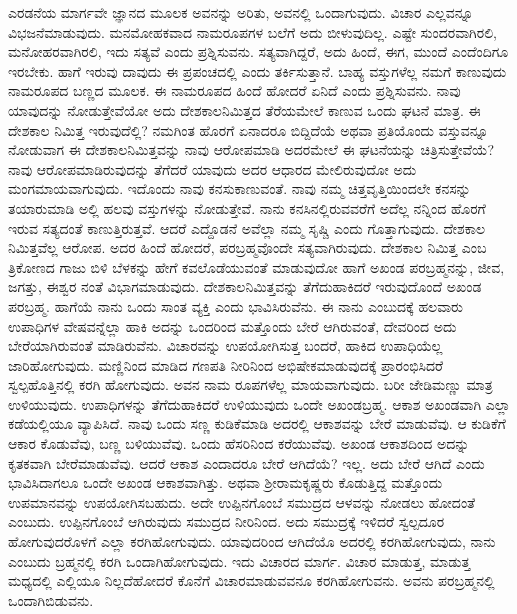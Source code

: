 ಎರಡನೆಯ ಮಾರ್ಗವೇ ಜ್ಞಾನದ ಮೂಲಕ ಅವನನ್ನು ಅರಿತು, ಅವನಲ್ಲಿ ಒಂದಾಗುವುದು. ವಿಚಾರ ಎಲ್ಲವನ್ನೂ ವಿಭಜನೆಮಾಡುವುದು. ಮನಮೋಹಕವಾದ ನಾಮರೂಪಗಳ ಬಲೆಗೆ ಅದು ಬೀಳುವುದಿಲ್ಲ. ಎಷ್ಟೇ ಸುಂದರವಾಗಿರಲಿ, ಮನೋಹರವಾಗಿರಲಿ, ಇದು ಸತ್ಯವೆ ಎಂದು ಪ್ರಶ್ನಿಸುವನು. ಸತ್ಯವಾಗಿದ್ದರೆ, ಅದು ಹಿಂದೆ, ಈಗ, ಮುಂದೆ ಎಂದೆಂದಿಗೂ ಇರಬೇಕು. ಹಾಗೆ ಇರುವು ದಾವುದು ಈ ಪ್ರಪಂಚದಲ್ಲಿ ಎಂದು ತರ್ಕಿಸುತ್ತಾನೆ. ಬಾಹ್ಯ ವಸ್ತುಗಳೆಲ್ಲ ನಮಗೆ ಕಾಣುವುದು ನಾಮರೂಪದ ಬಣ್ಣದ ಮೂಲಕ. ಈ ನಾಮರೂಪದ ಹಿಂದೆ ಹೋದರೆ ಏನಿದೆ ಎಂದು ಪ್ರಶ್ನಿಸುವನು. ನಾವು ಯಾವುದನ್ನು ನೋಡುತ್ತೇವೆಯೋ ಅದು ದೇಶಕಾಲನಿಮಿತ್ತದ ತೆರೆಯಮೇಲೆ ಕಾಣುವ ಒಂದು ಘಟನೆ ಮಾತ್ರ. ಈ ದೇಶಕಾಲ ನಿಮಿತ್ತ ಇರುವುದೆಲ್ಲಿ? ನಮಗಿಂತ ಹೊರಗೆ ಏನಾದರೂ ಬಿದ್ದಿದೆಯೆ ಅಥವಾ ಪ್ರತಿಯೊಂದು ವಸ್ತುವನ್ನೂ ನೋಡುವಾಗ ಈ ದೇಶಕಾಲನಿಮಿತ್ತವನ್ನು ನಾವು ಆರೋಪಮಾಡಿ ಅದರಮೇಲೆ ಈ ಘಟನೆಯನ್ನು ಚಿತ್ರಿಸುತ್ತೇವೆಯೆ? ನಾವು ಆರೋಪಮಾಡಿರುವುದನ್ನು ತೆಗೆದರೆ ಯಾವುದು ಅದರ ಆಧಾರದ ಮೇಲಿರುವುದೋ ಅದು ಮಂಗಮಾಯವಾಗುವುದು. ಇದೊಂದು ನಾವು ಕನಸುಕಾಣುವಂತೆ. ನಾವು ನಮ್ಮ ಚಿತ್ತವೃತ್ತಿಯಿಂದಲೇ ಕನಸನ್ನು ತಯಾರುಮಾಡಿ ಅಲ್ಲಿ ಹಲವು ವಸ್ತುಗಳನ್ನು ನೋಡುತ್ತೇವೆ. ನಾನು ಕನಸಿನಲ್ಲಿರುವವರೆಗೆ ಅದೆಲ್ಲ ನನ್ನಿಂದ ಹೊರಗೆ ಇರುವ ಸತ್ಯದಂತೆ ಕಾಣುತ್ತಿರುತ್ತವೆ. ಆದರೆ ಎದ್ದೊಡನೆ ಅವೆಲ್ಲಾ ನಮ್ಮ ಸೃಷ್ಚಿ ಎಂದು ಗೊತ್ತಾಗುವುದು. ದೇಶಕಾಲ ನಿಮಿತ್ತವೆಲ್ಲ ಆರೋಪ. ಅದರ ಹಿಂದೆ ಹೋದರೆ, ಪರಬ್ರಹ್ಮವೊಂದೇ ಸತ್ಯವಾಗಿರುವುದು. ದೇಶಕಾಲ ನಿಮಿತ್ತ ಎಂಬ ತ್ರಿಕೋಣದ ಗಾಜು ಬಿಳಿ ಬೆಳಕನ್ನು ಹೇಗೆ ಕವಲೊಡೆಯುವಂತೆ ಮಾಡುವುದೋ ಹಾಗೆ ಅಖಂಡ ಪರಬ್ರಹ್ಮನನ್ನು, ಜೀವ, ಜಗತ್ತು, ಈಶ್ವರ ನಂತೆ ವಿಭಾಗಮಾಡುವುದು. ದೇಶಕಾಲನಿಮಿತ್ತವನ್ನು ತೆಗೆದುಹಾಕಿದರೆ ಇರುವುದೊಂದೆ ಅಖಂಡ ಪರಬ್ರಹ್ಮ. ಹಾಗೆಯೆ ನಾನು ಒಂದು ಸಾಂತ ವ್ಯಕ್ತಿ ಎಂದು ಭಾವಿಸಿರುವೆನು. ಈ ನಾನು ಎಂಬುದಕ್ಕೆ ಹಲವಾರು ಉಪಾಧಿಗಳ ವೇಷವನ್ನೆಲ್ಲಾ ಹಾಕಿ ಅದನ್ನು ಒಂದರಿಂದ ಮತ್ತೊಂದು ಬೇರೆ ಆಗಿರುವಂತೆ, ದೇವರಿಂದ ಅದು ಬೇರೆಯಾಗಿರುವಂತೆ ಮಾಡಿರುವೆನು. ವಿಚಾರವನ್ನು ಉಪಯೋಗಿಸುತ್ತ ಬಂದರೆ, ಹಾಕಿದ ಉಪಾಧಿಯೆಲ್ಲ ಜಾರಿಹೋಗುವುದು. ಮಣ್ಣಿನಿಂದ ಮಾಡಿದ ಗಣಪತಿ ನೀರಿನಿಂದ ಅಭಿಷೇಕಮಾಡುವುದಕ್ಕೆ ಪ್ರಾರಂಭಿಸಿದರೆ ಸ್ವಲ್ಪಹೊತ್ತಿನಲ್ಲಿ ಕರಗಿ ಹೋಗುವುದು. ಅವನ ನಾಮ ರೂಪಗಳೆಲ್ಲ ಮಾಯವಾಗುವುದು. ಬರೀ ಜೇಡಿಮಣ್ಣು ಮಾತ್ರ ಉಳಿಯುವುದು. ಉಪಾಧಿಗಳನ್ನು ತೆಗೆದುಹಾಕಿದರೆ ಉಳಿಯುವುದು ಒಂದೇ ಅಖಂಡಬ್ರಹ್ಮ. ಆಕಾಶ ಅಖಂಡವಾಗಿ ಎಲ್ಲಾ ಕಡೆಯಲ್ಲಿಯೂ ವ್ಯಾಪಿಸಿದೆ. ನಾವು ಒಂದು ಸಣ್ಣ ಕುಡಿಕೆಮಾಡಿ ಅದರಲ್ಲಿ ಆಕಾಶವನ್ನು ಬೇರೆ ಮಾಡುವೆವು. ಆ ಕುಡಿಕೆಗೆ ಆಕಾರ ಕೊಡುವೆವು, ಬಣ್ಣ ಬಳಿಯುವೆವು. ಒಂದು ಹೆಸರಿನಿಂದ ಕರೆಯುವೆವು. ಅಖಂಡ ಆಕಾಶದಿಂದ ಅದನ್ನು ಕೃತಕವಾಗಿ ಬೇರೆಮಾಡುವೆವು. ಆದರೆ ಆಕಾಶ ಎಂದಾದರೂ ಬೇರೆ ಆಗಿದೆಯೆ? ಇಲ್ಲ. ಅದು ಬೇರೆ ಆಗಿದೆ ಎಂದು ಭಾವಿಸಿದಾಗಲೂ ಒಂದೇ ಅಖಂಡ ಆಕಾಶವಾಗಿತ್ತು. ಅಥವಾ ಶ‍್ರೀರಾಮಕೃಷ್ಣರು ಕೊಡುತ್ತಿದ್ದ ಮತ್ತೊಂದು ಉಪಮಾನವನ್ನು ಉಪಯೋಗಿಸಬಹುದು. ಅದೇ ಉಪ್ಪಿನಗೊಂಬೆ ಸಮುದ್ರದ ಆಳವನ್ನು ನೋಡಲು ಹೋದಂತೆ ಎಂಬುದು. ಉಪ್ಪಿನಗೊಂಬೆ ಆಗಿರುವುದು ಸಮುದ್ರದ ನೀರಿನಿಂದ. ಅದು ಸಮುದ್ರಕ್ಕೆ ಇಳಿದರೆ ಸ್ವಲ್ಪದೂರ ಹೋಗುವುದರೊಳಗೆ ಎಲ್ಲಾ ಕರಗಿಹೋಗುವುದು. ಯಾವುದರಿಂದ ಆಗಿದೆಯೊ ಅದರಲ್ಲಿ ಕರಗಿಹೋಗುವುದು, ನಾನು ಎಂಬುದು ಬ್ರಹ್ಮನಲ್ಲಿ ಕರಗಿ ಒಂದಾಗಿಹೋಗುವುದು. ಇದು ವಿಚಾರದ ಮಾರ್ಗ. ವಿಚಾರ ಮಾಡುತ್ತ, ಮಾಡುತ್ತ ಮಧ್ಯದಲ್ಲಿ ಎಲ್ಲಿಯೂ ನಿಲ್ಲದೆಹೋದರೆ ಕೊನೆಗೆ ವಿಚಾರಮಾಡುವವನೂ ಕರಗಿಹೋಗುವನು. ಅವನು ಪರಬ್ರಹ್ಮನಲ್ಲಿ ಒಂದಾಗಿಬಿಡುವನು.

